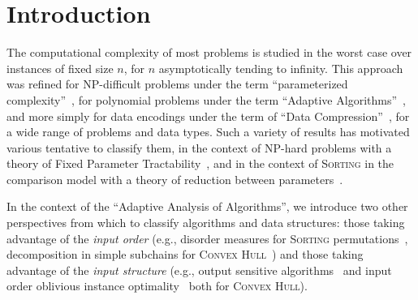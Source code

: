 \section{Introduction}
\label{sec:intro}


The computational complexity of most problems is studied in the worst
case over instances of fixed size $n$, for $n$ asymptotically tending
to infinity. This approach was refined for NP-difficult problems under
the term ``parameterized
complexity''~\cite{2006-BOOK-ParameterizedComplexityTheory-FlumGrohe},
for polynomial problems under the term ``Adaptive
Algorithms''~\cite{1992-ACMCS-ASurveyOfAdaptiveSortingAlgorithms-EstivillCastroWood,1992-ACJ-AnOverviewOfAdaptiveSorting-MoffatPetersson},
and more simply for data encodings under the term of ``Data
Compression''~\cite{2013-TCS-OnCompressingPermutationsAndAdaptiveSorting-BarbayNavarro},
for a wide range of problems and data types.
Such a variety of results has motivated various tentative to classify
them, in the context of NP-hard problems with a theory of Fixed
Parameter
Tractability~\cite{2006-BOOK-ParameterizedComplexityTheory-FlumGrohe},
and in the context of \textsc{Sorting} in the comparison model with a theory of
reduction between
parameters~\cite{1995-DAM-AFrameworkForAdaptiveSorting-PeterssonMoffat}.


In the context of the ``Adaptive Analysis of Algorithms'', we
introduce two other perspectives from which to classify algorithms and
data structures: those taking advantage of the \emph{input order}
(e.g., disorder measures for \textsc{Sorting}
permutations~\cite{1992-ACJ-AnOverviewOfAdaptiveSorting-MoffatPetersson,1992-ACMCS-ASurveyOfAdaptiveSortingAlgorithms-EstivillCastroWood},
decomposition in simple subchains for \textsc{Convex
  Hull}~\cite{2002-SWAT-AdaptiveAlgorithmsForConstructingConvexHullsAndTriangulationsOfPolygonalChains-LevcopoulosLingasMitchell})
and those taking advantage of the \emph{input structure} (e.g., output
sensitive
algorithms~\cite{1986-JCom-TheUltimatePlanarConvexHullAlgorithm-KirkpatrickSeidel}
and input order oblivious instance
optimality~\cite{2009-FOCS-InstanceOptimalGeometricAlgorithms-AfshaniBarbayChan}
both for \textsc{Convex Hull}).

